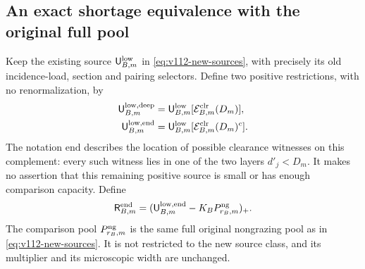 \subsection{An exact shortage equivalence with the original full pool}

Keep the existing source $\mathsf U_{B,m}^{\rm low}$ in
\eqref{eq:v112-new-sources}, with precisely its old incidence-load,
section and pairing selectors.  Define two positive restrictions,
with no renormalization, by
\begin{equation}\label{eq:lc-positive-split}
 \begin{split}
 \mathsf U_{B,m}^{\rm low,deep}
    &=\mathsf U_{B,m}^{\rm low}
                         [\mathcal E^{\rm clr}_{B,m}(D_m)],\\
 \mathsf U_{B,m}^{\rm low,end}
    &=\mathsf U_{B,m}^{\rm low}
                         [\mathcal E^{\rm clr}_{B,m}(D_m)^c].
 \end{split}
\end{equation}
The notation $\mathrm{end}$ describes the location of possible
clearance witnesses on this complement: every such witness lies
in one of the two layers $d'_j<D_m$.  It makes no assertion that
this remaining positive source is small or has enough comparison
capacity.  Define
\begin{equation}\label{eq:lc-same-pool}
 \mathsf R_{B,m}^{\rm end}
       =(\mathsf U_{B,m}^{\rm low,end}
                            -K_BP_{r_B,m}^{\rm ng})_+.
\end{equation}
The comparison pool $P_{r_B,m}^{\rm ng}$ is the same full original
nongrazing pool as in \eqref{eq:v112-new-sources}.  It is not
restricted to the new source class, and its multiplier and its
microscopic width are unchanged.

